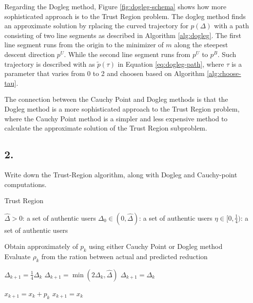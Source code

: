 \documentclass[unicode,11pt,a4paper,oneside,numbers=endperiod,openany]{scrartcl}
\begin{document}
Regarding the Dogleg method, Figure \ref{fig:dogleg-schema} shows how more sophisticated approach 
is to the Trust Region problem.
The dogleg method finds an approximate solution by rplacing the curved trajectory for $p(\Delta)$
with a path consisting of two line segments as described in Algorithm \ref{alg:dogleg}.
The first line segment runs from the origin to the minimizer of $m$ along the steepest descent direction $p^U$.
While the second line segment runs from $p^U$ to $p^B$.
Such trajectory is described with as $\tilde{p}(\tau)$ in Equation \ref{eq:dogleg-path},
where $\tau$ is a parameter that varies from 0 to 2 and choosen based on Algorithm \ref{alg:choose-tau}.

The connection between the Cauchy Point and Dogleg methods is that the Dogleg method is a more sophisticated
approach to the Trust Region problem, where the Cauchy Point method is a simpler and less expensive method
to calculate the approximate solution of the Trust Region subproblem.

\subsection*{2.}
Write down the Trust-Region algorithm, along with Dogleg and Cauchy-point computations.



 

\begin{algorithm}
\caption{Trust Region}\label{alg:trust-region}
  \begin{algorithmic}[1]
    \State $\hat{\Delta} > 0$: a set of authentic users
    \State $\Delta_0 \in ( 0, \hat{\Delta} )$: a set of authentic users
    \State $\eta \in [ 0, \frac{1}{4} )$: a set of authentic users

        \State Obtain approximately of $p_k$ using either Cauchy Point or Dogleg method 
        \State Evaluate $\rho_k$ from the ration between actual and predicted reduction

            \State $\Delta_{k+1} = \frac{1}{4} \Delta_k$
        \Else
                \State $\Delta_{k+1} = \min(2 \Delta_k, \hat{\Delta})$
            \Else
                \State $\Delta_{k+1} = \Delta_k$
            \EndIf
        \EndIf

            \State $x_{k+1} = x_k + p_k$
        \Else
            \State $x_{k+1} = x_k$
        \EndIf
    \EndFor
  \end{algorithmic}
\end{algorithm}
\end{document}
